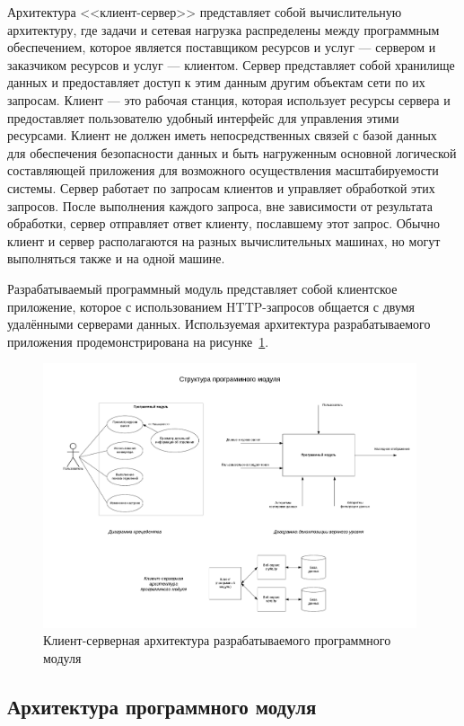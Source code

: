 Архитектура <<клиент-сервер>> представляет собой вычислительную архитектуру,
где задачи и сетевая нагрузка распределены между программным обеспечением,
которое является поставщиком ресурсов и услуг --- сервером и заказчиком ресурсов
и услуг --- клиентом.
Сервер представляет собой хранилище данных и предоставляет доступ к этим
данным другим объектам сети по их запросам.
Клиент --- это рабочая станция, которая использует ресурсы сервера и
предоставляет пользователю удобный интерфейс для управления этими ресурсами.
Клиент не должен иметь непосредственных связей с базой данных для
обеспечения безопасности данных и быть нагруженным основной логической
составляющей приложения для возможного осуществления масштабируемости системы.
Сервер работает по запросам клиентов и управляет обработкой этих запросов.
После выполнения каждого запроса, вне зависимости от результата обработки,
сервер отправляет ответ клиенту, пославшему этот запрос.
Обычно клиент и сервер располагаются на разных вычислительных машинах,
но могут выполняться также и на одной машине.

Разрабатываемый программный модуль представляет собой клиентское приложение,
которое с использованием HTTP-запросов общается с двумя удалёнными серверами данных.
Используемая архитектура разрабатываемого приложения продемонстрирована
на рисунке~\ref{fig:client_servers_schema}.
\begin{figure}[h!]
  \centering
  \includegraphics[width=110mm]{fig/client_servers_schema}
  \caption{Клиент-серверная архитектура разрабатываемого программного модуля}
  \label{fig:client_servers_schema}
\end{figure}



\subsection{Архитектура программного модуля}

